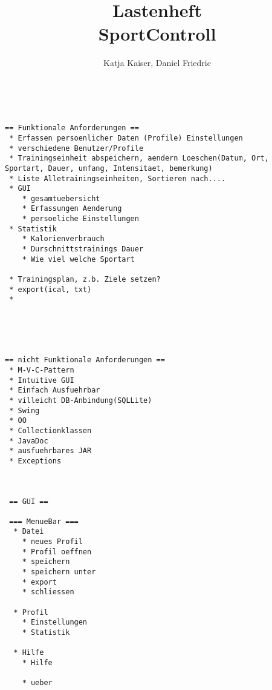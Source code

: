 \documentclass[12pt,a4paper]{article}
\author{Katja Kaiser, Daniel Friedric}
\title{Lastenheft \\ SportControll}
\begin{document}
\maketitle



\begin{verbatim}


== Funktionale Anforderungen ==
 * Erfassen persoenlicher Daten (Profile) Einstellungen
 * verschiedene Benutzer/Profile
 * Trainingseinheit abspeichern, aendern Loeschen(Datum, Ort, Sportart, Dauer, umfang, Intensitaet, bemerkung)
 * Liste Alletrainingseinheiten, Sortieren nach....
 * GUI 
 	* gesamtuebersicht
 	* Erfassungen Aenderung
 	* persoeliche Einstellungen
 * Statistik
 	* Kalorienverbrauch
 	* Durschnittstrainings Dauer
 	* Wie viel welche Sportart
 	 
 * Trainingsplan, z.b. Ziele setzen?
 * export(ical, txt)
 * 
 




== nicht Funktionale Anforderungen ==
 * M-V-C-Pattern
 * Intuitive GUI
 * Einfach Ausfuehrbar
 * villeicht DB-Anbindung(SQLLite)
 * Swing
 * OO
 * Collectionklassen
 * JavaDoc
 * ausfuehrbares JAR
 * Exceptions
 
 
 
 == GUI ==
 
 === MenueBar ===
  * Datei
    * neues Profil
  	* Profil oeffnen
  	* speichern
  	* speichern unter
  	* export
  	* schliessen
  	
  * Profil
  	* Einstellungen
  	* Statistik
  	
  * Hilfe
  	* Hilfe

  	* ueber
  	
  	\end{verbatim}
\end{document}
